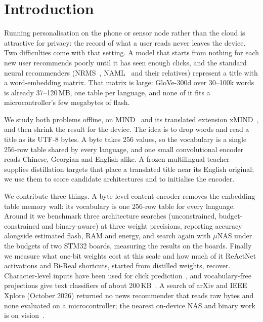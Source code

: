 \documentclass{llncs}
\begin{document}
\section{Introduction}
Running personalisation on the phone or sensor node rather than the cloud is
attractive for privacy: the record of what a user reads never leaves the device.
Two difficulties come with that setting. A
model that starts from nothing for each new user recommends poorly until it has
seen enough clicks, and the standard neural recommenders (NRMS~\cite{wu2019nrms},
NAML~\cite{wu2019naml} and their relatives) represent a title with a
word-embedding matrix. That matrix is large: GloVe-300d over 30--100k words is
already 37--120\,MB, one table per language, and none of it fits a
microcontroller's few megabytes of flash.

We study both problems offline, on MIND~\cite{wu2020mind} and its translated
extension xMIND~\cite{iana2024xmind}, and then shrink the result for the device.
The idea is to drop words and read a title as its UTF-8 bytes. A byte takes 256
values, so the vocabulary is a single 256-row table shared by every language, and
one small convolutional encoder reads Chinese, Georgian and English alike. A frozen
multilingual teacher~\cite{reimers2020multilingual} supplies distillation targets
that place a translated title near its English original; we use them to score
candidate architectures and to initialise the encoder.

We contribute three things. A byte-level content encoder removes the
embedding-table memory wall: its vocabulary is one 256-row table for every
language. Around it we benchmark three architecture searches (unconstrained,
budget-constrained and binary-aware) at three weight precisions, reporting
accuracy alongside estimated flash, RAM and energy, and search again with
$\mu$NAS under the budgets of two STM32 boards, measuring the results on the
boards. Finally we measure what one-bit weights cost at this scale and how much
of it ReActNet activations and Bi-Real shortcuts, started from distilled
weights, recover. Character-level inputs have been used
for click prediction~\cite{edizel2017char}, and vocabulary-free projections give
text classifiers of about 200\,KB~\cite{kaliamoorthi2019prado}. A search of arXiv
and IEEE Xplore (October 2026) returned no news recommender that reads raw bytes
and none evaluated on a microcontroller; the nearest on-device NAS and binary
work is on vision~\cite{lin2020mcunet,nasbnn2024,pighetti2026nasbnn}.
\end{document}
